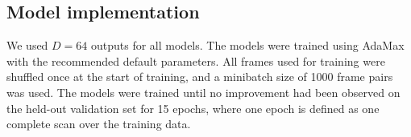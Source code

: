 

\subsection{Model implementation}

We used $D = 64$ outputs for all models.
The models were trained using AdaMax \parencite{kingma2014adam} with the recommended default parameters. %
All frames used for training were shuffled once at the start of training, and a minibatch size of 1000 frame pairs was used.
The models were trained until no improvement had been observed on the held-out validation set for 15 epochs, where one epoch is defined as one complete scan over the training data.

